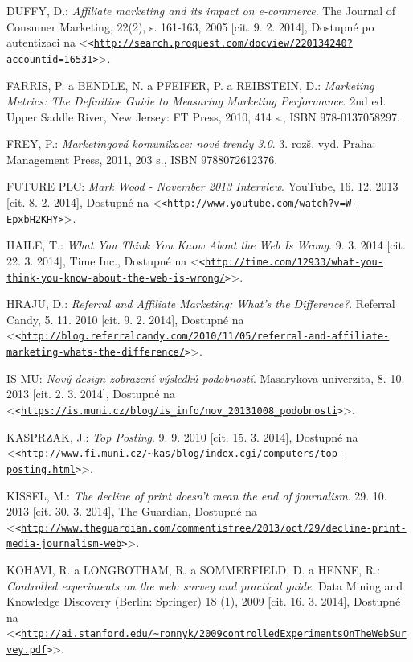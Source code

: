 \documentclass[12pt,twoside,openany]{fithesis}
\let\origurl\url
\def\url#1{\texttt{<\origurl{#1}>}}
\begin{document}
\begin{thebibliography}{99}
DUFFY, D.: \emph{Affiliate marketing and its impact on e-commerce}. The Journal of Consumer Marketing, 22(2),
        s. 161-163, 2005 [cit. 9. 2. 2014], Dostupné po autentizaci na {\textless}\url{http://search.proquest.com/docview/220134240?accountid=16531}{\textgreater}.

FARRIS, P. a BENDLE, N. a PFEIFER, P. a REIBSTEIN, D.: \emph{Marketing Metrics: The Definitive Guide to Measuring Marketing
      Performance}. 2nd ed. Upper Saddle River, New Jersey: FT Press, 2010, 414 s., ISBN 978-0137058297.

FREY, P.: \emph{Marketingová komunikace: nové trendy 3.0}. 3. rozš. vyd. Praha: Management Press, 2011, 203 s., ISBN 9788072612376.

FUTURE PLC: \emph{Mark Wood - November 2013 Interview}. YouTube, 16. 12. 2013 [cit. 8. 2. 2014], Dostupné na {\textless}\url{http://www.youtube.com/watch?v=W-EpxbH2KHY}{\textgreater}.

HAILE, T.: \emph{What You Think You Know About the Web Is Wrong}. 9. 3. 2014 [cit. 22. 3. 2014], Time Inc., Dostupné na {\textless}\url{http://time.com/12933/what-you-think-you-know-about-the-web-is-wrong/}{\textgreater}.

HRAJU, D.: \emph{Referral and Affiliate Marketing: What's the Difference?}. Referral Candy, 5. 11. 2010 [cit. 9. 2. 2014], Dostupné na {\textless}\url{http://blog.referralcandy.com/2010/11/05/referral-and-affiliate-marketing-whats-the-difference/}{\textgreater}.

IS MU: \emph{Nový design zobrazení výsledků podobností}. Masarykova univerzita, 8. 10. 2013 [cit. 2. 3. 2014], Dostupné na {\textless}\url{https://is.muni.cz/blog/is_info/nov_20131008_podobnosti}{\textgreater}.

KASPRZAK, J.: \emph{Top Posting}. 9. 9. 2010 [cit. 15. 3. 2014], Dostupné na {\textless}\url{http://www.fi.muni.cz/~kas/blog/index.cgi/computers/top-posting.html}{\textgreater}.

KISSEL, M.: \emph{The decline of print doesn't mean the end of journalism}. 29. 10. 2013 [cit. 30. 3. 2014], The Guardian, Dostupné na {\textless}\url{http://www.theguardian.com/commentisfree/2013/oct/29/decline-print-media-journalism-web}{\textgreater}.

KOHAVI, R. a LONGBOTHAM, R. a SOMMERFIELD, D. a HENNE, R.: \emph{Controlled experiments on the web: survey and practical
      guide}. Data Mining and Knowledge Discovery (Berlin: Springer)
        18 (1), 2009 [cit. 16. 3. 2014], Dostupné na {\textless}\url{http://ai.stanford.edu/~ronnyk/2009controlledExperimentsOnTheWebSurvey.pdf}{\textgreater}. 


\end{thebibliography}
\end{document}
